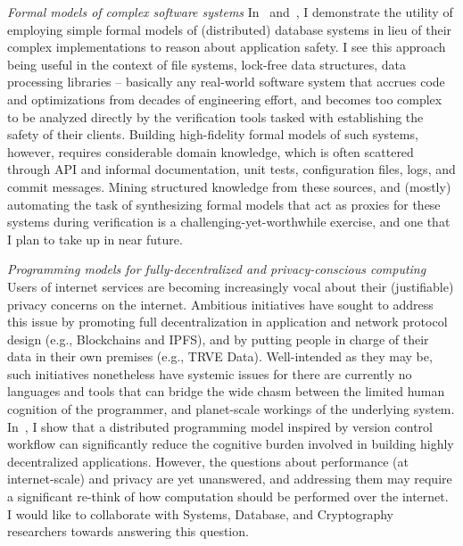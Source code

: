 {\itshape\color{MidnightBlue}Formal models of complex software systems}
In~\cite{popl18} and~\cite{oopsla18}, I demonstrate the utility of
employing simple formal models of (distributed) database systems in
lieu of their complex implementations to reason about application
safety. I see this approach being useful in the context of file
systems, lock-free data structures, data processing libraries --
basically any real-world software system that accrues code and
optimizations from decades of engineering effort, and becomes too
complex to be analyzed directly by the verification tools tasked with
establishing the safety of their clients. Building high-fidelity
formal models of such systems, however, requires considerable domain
knowledge, which is often scattered through API and informal
documentation, unit tests, configuration files, logs, and commit
messages. Mining structured knowledge from these sources, and (mostly)
automating the task of synthesizing formal models that act as proxies
for these systems during verification is a challenging-yet-worthwhile
exercise, and one that I plan to take up in near future.

{\itshape\color{MidnightBlue}Programming models for
fully-decentralized and privacy-conscious computing}  Users of
internet services are becoming increasingly vocal about their
(justifiable) privacy concerns on the internet. Ambitious initiatives
have sought to address this issue by promoting full decentralization in
application and network protocol design (e.g., Blockchains and IPFS),
and by putting people in charge of their data in their own premises
(e.g., TRVE Data).  Well-intended as they may be, such initiatives
nonetheless have systemic issues for there are currently no languages
and tools that can bridge the wide chasm between the limited human
cognition of the programmer, and planet-scale workings of the
underlying system. In~\cite{snapl19}, I show that a distributed
programming model inspired by version control workflow can
significantly reduce the cognitive burden involved in building highly
decentralized applications. However, the questions about performance
(at internet-scale) and privacy are yet unanswered, and addressing
them may require a significant re-think of how computation should be
performed over the internet. I would like to collaborate with Systems,
Database, and Cryptography researchers towards answering this
question.

